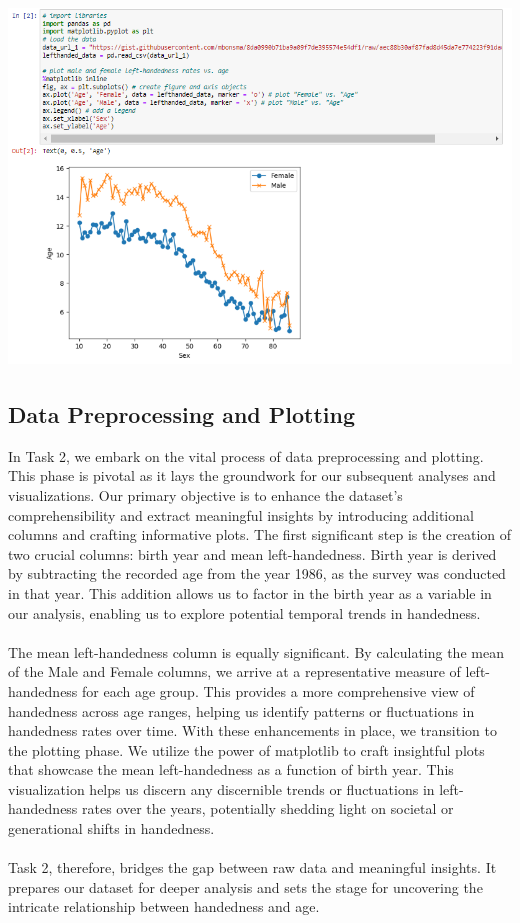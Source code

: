 \documentclass{article}
\begin{document}
        \begin{center}
            \includegraphics[height=270pt]{1.png}\\
        \end{center}
\vspace{0.5cm}

\subsection{Data Preprocessing and Plotting}

In Task 2, we embark on the vital process of data preprocessing and plotting. This phase is pivotal as it lays the groundwork for our subsequent analyses and visualizations. Our primary objective is to enhance the dataset's comprehensibility and extract meaningful insights by introducing additional columns and crafting informative plots. The first significant step is the creation of two crucial columns: birth year and mean left-handedness. Birth year is derived by subtracting the recorded age from the year 1986, as the survey was conducted in that year. This addition allows us to factor in the birth year as a variable in our analysis, enabling us to explore potential temporal trends in handedness.\\ \\ The mean left-handedness column is equally significant. By calculating the mean of the Male and Female columns, we arrive at a representative measure of left-handedness for each age group. This provides a more comprehensive view of handedness across age ranges, helping us identify patterns or fluctuations in handedness rates over time. With these enhancements in place, we transition to the plotting phase. We utilize the power of matplotlib to craft insightful plots that showcase the mean left-handedness as a function of birth year. This visualization helps us discern any discernible trends or fluctuations in left-handedness rates over the years, potentially shedding light on societal or generational shifts in handedness.\\ \\ Task 2, therefore, bridges the gap between raw data and meaningful insights. It prepares our dataset for deeper analysis and sets the stage for uncovering the intricate relationship between handedness and age.
\end{document}

